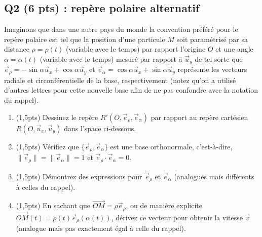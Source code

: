 \documentclass[french,10pt]{article}
\begin{document}
	\subsection*{Q2 (6 pts) : repère polaire alternatif }
		Imaginons que dans une autre pays du monde la convention préféré pour le repère polaire est tel que la position d'une particule $M$ soit paramétrisé par sa distance $\rho = \rho(t)$ (variable avec le temps) par rapport l'origine $O$ et une angle $\alpha = \alpha(t)$ (variable avec le temps) mesuré par rapport à $\Vec{u}_y$ de tel sorte que $\Vec{e}_{\rho} = -\sin{\alpha} \Vec{u}_x + \cos{\alpha} \Vec{u}_y$ et $\Vec{e}_{\alpha} = \cos{\alpha} \Vec{u}_x + \sin{\alpha} \Vec{u}_y$ représente les vecteurs radiale et circonférentielle de la base, respectivement (notez qu'on a utilisé d'autres lettres pour cette nouvelle base afin de ne pas confondre avec la notation du rappel).
		\begin{enumerate}
			\item (1,5pts) Dessinez le repère $R'(O, \Vec{e}_{\rho}, \Vec{e}_\alpha)$ par rapport au repère cartésien $R(O, \Vec{u}_x, \Vec{u}_y)$ dans l'space ci-dessous.
			\item (1,5pts) Vérifiez que $\{ \Vec{e}_{\rho}, \Vec{e}_\alpha\}$ est une base orthonormale, c'est-à-dire, $\|\Vec{e}_{\rho}\| = \|\Vec{e}_{\alpha}\| = 1$ et $\Vec{e}_{\rho} \cdot \Vec{e}_{\alpha} = 0$.
			\item (1,5pts) Démontrez des expressions pour $\dot{\Vec{e}}_{\rho}$ et $\dot{\Vec{e}}_{\alpha}$ (analogues mais différents à celles du rappel).
			\item (1,5pts) En sachant que $\Vec{OM} = \rho \Vec{e}_\rho$, ou de manière explicite $\Vec{OM}(t) = \rho(t) \Vec{e}_\rho(\alpha(t))$, dérivez ce vecteur pour obtenir la vitesse $\Vec{v}$ (analogue mais pas exactement égal à celle du rappel).
		\end{enumerate}
\end{document}

